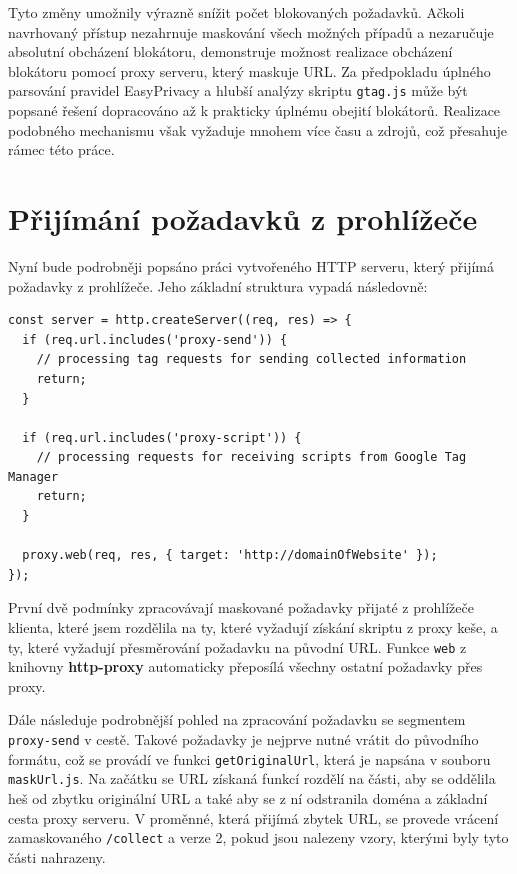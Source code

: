 Tyto změny umožnily výrazně snížit počet blokovaných požadavků. Ačkoli navrhovaný přístup nezahrnuje maskování všech možných případů a nezaručuje absolutní obcházení blokátoru, demonstruje možnost realizace obcházení blokátoru pomocí proxy serveru, který maskuje URL. Za předpokladu úplného parsování pravidel EasyPrivacy a hlubší analýzy skriptu \texttt{gtag.js} může být popsané řešení dopracováno až k prakticky úplnému obejití blokátorů. Realizace podobného mechanismu však vyžaduje mnohem více času a zdrojů, což přesahuje rámec této práce.

\section{Přijímání požadavků z prohlížeče}
Nyní bude podrobněji popsáno práci vytvořeného HTTP serveru, který přijímá požadavky z prohlížeče. Jeho základní struktura vypadá následovně:
\bigskip
\bigskip
\begin{lstlisting}[caption=Function that receives browser requests]
const server = http.createServer((req, res) => {
  if (req.url.includes('proxy-send')) {
    // processing tag requests for sending collected information
    return;
  }
  
  if (req.url.includes('proxy-script')) {
    // processing requests for receiving scripts from Google Tag Manager
    return;
  }
  
  proxy.web(req, res, { target: 'http://domainOfWebsite' });
});
\end{lstlisting}
První dvě podmínky zpracovávají maskované požadavky přijaté z prohlížeče klienta, které jsem rozdělila na ty, které vyžadují získání skriptu z proxy keše, a ty, které vyžadují přesměrování požadavku na původní URL. Funkce \texttt{web} z knihovny \textbf{http-proxy} automaticky přeposílá všechny ostatní požadavky přes proxy.

Dále následuje podrobnější pohled na zpracování požadavku se segmentem \texttt{proxy-send} v cestě. Takové požadavky je nejprve nutné vrátit do původního formátu, což se provádí ve funkci \texttt{getOriginalUrl}, která je napsána v souboru \texttt{maskUrl.js}. Na začátku se URL získaná funkcí rozdělí na části, aby se oddělila heš od zbytku originální URL a také aby se z ní odstranila doména a základní cesta proxy serveru. V proměnné, která přijímá zbytek URL, se provede vrácení zamaskovaného \texttt{/collect} a verze 2, pokud jsou nalezeny vzory, kterými byly tyto části nahrazeny.

